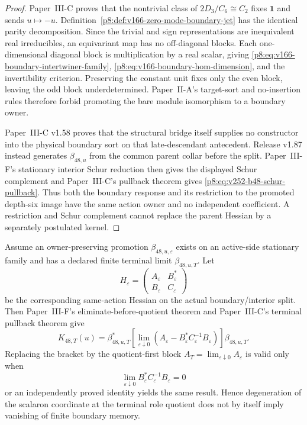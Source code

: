 \documentclass[12pt,a4paper]{article}
\begin{document}
\begin{proof}
Paper~III-C proves that the nontrivial class of
\(2D_3/C_6\cong C_2\) fixes \(\mathbf1\) and sends \(u\mapsto-u\).
Definition~\ref{p8:def:v166-zero-mode-boundary-jet} has the identical parity
decomposition.  Since the trivial and sign representations are inequivalent
real irreducibles, an equivariant map has no off-diagonal blocks.  Each
one-dimensional diagonal block is multiplication by a real scalar, giving
\eqref{p8:eq:v166-boundary-intertwiner-family},
\eqref{p8:eq:v166-boundary-hom-dimension}, and the invertibility criterion.
Preserving the constant unit fixes only the even block, leaving the odd block
underdetermined.  Paper~II-A's target-sort and no-insertion rules therefore
forbid promoting the bare module isomorphism to a boundary owner.

Paper~III-C v1.58 proves that the structural bridge itself supplies no
constructor into the physical boundary sort on that late-descendant
antecedent.  Release v1.87 instead generates \(\beta_{48,u}\) from the common
parent collar before the split.  Paper~III-F's stationary interior Schur reduction
then gives the displayed Schur complement and Paper~III-C's pullback theorem
gives \eqref{p8:eq:v252-b48-schur-pullback}.  Thus both the boundary response and
its restriction to the promoted depth-six image have the same action owner and
no independent coefficient.  A restriction and Schur complement cannot
replace the parent Hessian by a separately postulated kernel.
\end{proof}

\begin{theorem}
\label{p8:thm:v252-owner-factorized-terminal-rar}
Assume an owner-preserving promotion \(\beta_{48,u,\varepsilon}\) exists on an
active-side stationary family and has a declared finite terminal limit
\(\beta_{48,u,T}\).  Let
\[
 H_\varepsilon=
 \begin{pmatrix}
  A_\varepsilon&B_\varepsilon^{*}\\
  B_\varepsilon&C_\varepsilon
 \end{pmatrix}
\]
be the corresponding same-action Hessian on the actual boundary/interior
split.  Then Paper~III-F's eliminate-before-quotient theorem and Paper~III-C's
terminal pullback theorem give
\begin{equation}
 \label{p8:eq:v252-terminal-b48-response}
 \boxed{
 K_{48,T}(u)=\beta_{48,u,T}^{*}
 \left[\lim_{\varepsilon\downarrow0}
 \left(A_\varepsilon-B_\varepsilon^{*}C_\varepsilon^{-1}B_\varepsilon\right)
 \right]\beta_{48,u,T}.}
\end{equation}
Replacing the bracket by the quotient-first block
\(A_T=\lim_{\varepsilon\downarrow0}A_\varepsilon\) is valid only when
\begin{equation}
 \label{p8:eq:v252-terminal-schur-memory-zero}
 \boxed{\lim_{\varepsilon\downarrow0}
 B_\varepsilon^{*}C_\varepsilon^{-1}B_\varepsilon=0}
\end{equation}
or an independently proved identity yields the same result.  Hence degeneration of the scalaron coordinate at the terminal role quotient does
not by itself imply vanishing of finite boundary memory.
\end{theorem}
\end{document}
